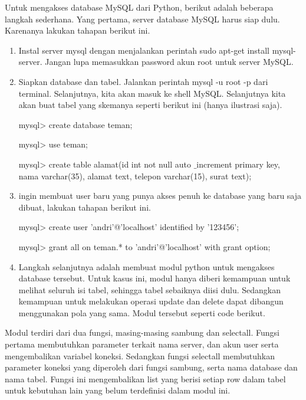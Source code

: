 Untuk mengakses database MySQL dari Python, berikut adalah beberapa langkah sederhana. Yang pertama, server database MySQL harus siap dulu. Karenanya lakukan tahapan berikut ini. \par
\noindent 
\begin{enumerate}
\item Instal server mysql dengan menjalankan perintah sudo apt-get install mysql-server. Jangan lupa memasukkan password akun root untuk server MySQL. \par
\noindent 
\item Siapkan database dan tabel. Jalankan perintah mysql -u root -p dari terminal. Selanjutnya, kita akan masuk ke shell MySQL. Selanjutnya kita akan buat tabel yang skemanya seperti berikut ini (hanya ilustrasi saja). \par
mysql> create database teman; \par
mysql> use teman; \hspace*{1.69in}  \par
mysql> create table alamat(id int not null auto $  \_  $increment primary key, nama varchar(35), alamat text, telepon varchar(15), surat text); \par
\vspace{12pt}
\noindent 
\item  ingin membuat user baru yang punya akses penuh ke database yang baru saja dibuat, lakukan tahapan berikut ini. \par
mysql> create user 'andri'@'localhost' identified by '123456'; \par
mysql> grant all on teman.* to 'andri'@'localhost' with grant option; \par
\noindent 
\item Langkah selanjutnya adalah membuat modul python untuk mengakses database tersebut. Untuk kasus ini, modul hanya diberi kemampuan untuk melihat seluruh isi tabel, sehingga tabel sebaiknya diisi dulu. Sedangkan kemampuan untuk melakukan operasi update dan delete dapat dibangun menggunakan pola yang sama. Modul tersebut seperti code berikut.\end{enumerate}
 \par
\vspace{12pt}
Modul terdiri dari dua fungsi, masing-masing sambung dan selectall. Fungsi pertama membutuhkan parameter terkait nama server, dan akun user serta mengembalikan variabel koneksi. Sedangkan fungsi selectall membutuhkan parameter koneksi yang diperoleh dari fungsi sambung, serta nama database dan nama tabel. Fungsi ini mengembalikan list yang berisi setiap row dalam tabel untuk kebutuhan lain yang belum terdefinisi dalam modul ini. \par

